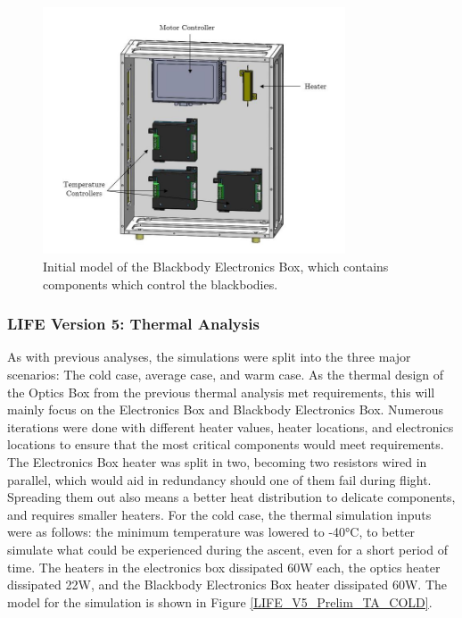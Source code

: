 \begin{figure}
    \centering
    \includegraphics[width=0.8\textwidth]{chap3_images/LIFE_V5_initial_images/BBEbox_V1_init_labelled.JPG}
    \caption{Initial model of the Blackbody Electronics Box, which contains components which control the blackbodies.}
    \label{fig:BBEBOX_PRELIM}
\end{figure}

\subsubsection{LIFE Version 5: Thermal Analysis}
As with previous analyses, the simulations were split into the three major scenarios: The cold case, average case, and warm case. As the thermal design of the Optics Box from the previous thermal analysis met requirements, this will mainly focus on the Electronics Box and Blackbody Electronics Box. Numerous iterations were done with different heater values, heater locations, and electronics locations to ensure that the most critical components would meet requirements. The Electronics Box heater was split in two, becoming two resistors wired in parallel, which would aid in redundancy should one of them fail during flight. Spreading them out also means a better heat distribution to delicate components, and requires smaller heaters. For the cold case, the thermal simulation inputs were as follows: the minimum temperature was lowered to -40°C, to better simulate what could be experienced during the ascent, even for a short period of time. The heaters in the electronics box dissipated 60W each, the optics heater dissipated 22W, and the Blackbody Electronics Box heater dissipated 60W. The model for the simulation is shown in Figure \ref{LIFE_V5_Prelim_TA_COLD}.

